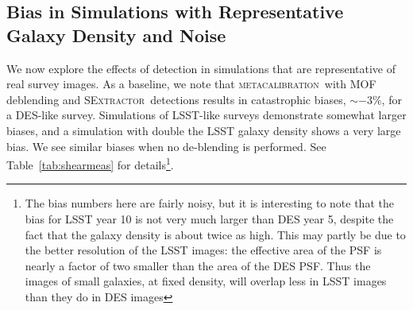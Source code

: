 \documentclass[fleqn,useAMS,usenatbib]{mnras}
\newcommand{\snr}{$S/N$}
\newcommand{\mcal}{\textsc{metacalibration}}
\newcommand{\sx}{\textsc{SExtractor}}
\begin{document}
%
%

\subsection{Bias in Simulations with Representative Galaxy Density and Noise}

We now explore the effects of detection in simulations that are representative
of real survey images. As a baseline, we note that \mcal\ with MOF deblending
and \sx\ detections results in catastrophic biases, $\sim-3\%$, for a DES-like
survey. Simulations of LSST-like surveys demonstrate somewhat larger biases,
and a simulation with double the LSST galaxy density shows a very large bias.
We see similar biases when no de-blending is performed.  See
Table~\ref{tab:shearmeas} for details\footnote{The bias numbers here are fairly
noisy, but it is interesting to note that the bias for LSST year 10 is not very
much larger than DES year 5, despite the fact that the galaxy density is about
twice as high.  This may partly be due to the better resolution of the LSST
images: the effective area of the PSF is nearly a factor of two smaller than
the area of the DES PSF.  Thus the images of small galaxies, at fixed density,
will overlap less in LSST images than they do in DES images}.
\end{document}
